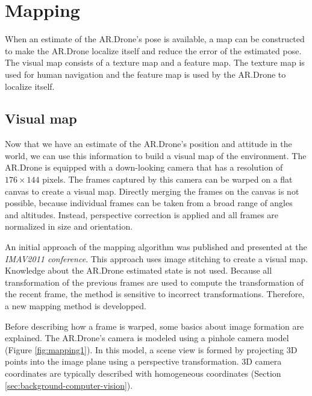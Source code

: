 	\section{Mapping}
	\label{sec:mapping}
When an estimate of the AR.Drone's pose is available, a map can be constructed to make the AR.Drone localize itself and reduce the error of the estimated pose.
The visual map consists of a texture map and a feature map.
The texture map is used for human navigation and the feature map is used by the AR.Drone to localize itself.

	\subsection{Visual map}
\label{sec:texture_map}
Now that we have an estimate of the AR.Drone's position and attitude in the world, we can use this information to build a visual map of the environment.
The AR.Drone is equipped with a down-looking camera that has a resolution of $176 \times 144$ pixels.
The frames captured by this camera can be warped on a flat canvas to create a visual map.
Directly merging the frames on the canvas is not possible, because individual frames can be taken from a broad range of angles and altitudes.
Instead, perspective correction is applied and all frames are normalized in size and orientation.

An initial approach of the mapping algorithm was published \cite{visser2011closing} and presented at the \textit{IMAV2011 conference}.
This approach uses image stitching \cite{levin2004seamless} to create a visual map.
Knowledge about the AR.Drone estimated state is not used.
Because all transformation of the previous frames are used to compute the transformation of the recent frame, the method is sensitive to incorrect transformations.
Therefore, a new mapping method is developped.

Before describing how a frame is warped, some basics about image formation are explained. %
The AR.Drone's camera is modeled using a pinhole camera model (Figure \ref{fig:mapping1}).
In this model, a scene view is formed by projecting 3D points into the image plane using a perspective transformation.
3D camera coordinates are typically described with homogeneous coordinates (Section \ref{sec:background-computer-vision}).

